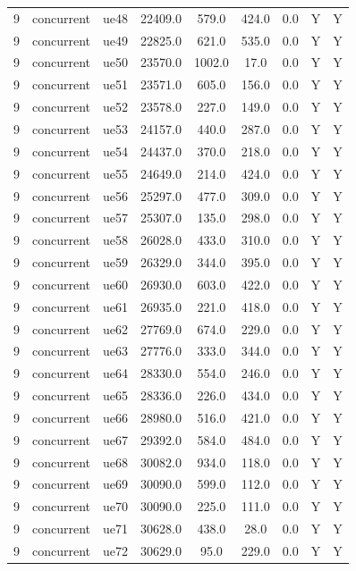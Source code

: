 \begin{table}[ht]
\begin{tabular}{|c|c|c|c|c|c|c|c|c|}
9 & concurrent & ue48 & 22409.0 & 579.0 & 424.0 & 0.0 & Y & Y \\
9 & concurrent & ue49 & 22825.0 & 621.0 & 535.0 & 0.0 & Y & Y \\
9 & concurrent & ue50 & 23570.0 & 1002.0 & 17.0 & 0.0 & Y & Y \\
9 & concurrent & ue51 & 23571.0 & 605.0 & 156.0 & 0.0 & Y & Y \\
9 & concurrent & ue52 & 23578.0 & 227.0 & 149.0 & 0.0 & Y & Y \\
9 & concurrent & ue53 & 24157.0 & 440.0 & 287.0 & 0.0 & Y & Y \\
9 & concurrent & ue54 & 24437.0 & 370.0 & 218.0 & 0.0 & Y & Y \\
9 & concurrent & ue55 & 24649.0 & 214.0 & 424.0 & 0.0 & Y & Y \\
9 & concurrent & ue56 & 25297.0 & 477.0 & 309.0 & 0.0 & Y & Y \\
9 & concurrent & ue57 & 25307.0 & 135.0 & 298.0 & 0.0 & Y & Y \\
9 & concurrent & ue58 & 26028.0 & 433.0 & 310.0 & 0.0 & Y & Y \\
9 & concurrent & ue59 & 26329.0 & 344.0 & 395.0 & 0.0 & Y & Y \\
9 & concurrent & ue60 & 26930.0 & 603.0 & 422.0 & 0.0 & Y & Y \\
9 & concurrent & ue61 & 26935.0 & 221.0 & 418.0 & 0.0 & Y & Y \\
9 & concurrent & ue62 & 27769.0 & 674.0 & 229.0 & 0.0 & Y & Y \\
9 & concurrent & ue63 & 27776.0 & 333.0 & 344.0 & 0.0 & Y & Y \\
9 & concurrent & ue64 & 28330.0 & 554.0 & 246.0 & 0.0 & Y & Y \\
9 & concurrent & ue65 & 28336.0 & 226.0 & 434.0 & 0.0 & Y & Y \\
9 & concurrent & ue66 & 28980.0 & 516.0 & 421.0 & 0.0 & Y & Y \\
9 & concurrent & ue67 & 29392.0 & 584.0 & 484.0 & 0.0 & Y & Y \\
9 & concurrent & ue68 & 30082.0 & 934.0 & 118.0 & 0.0 & Y & Y \\
9 & concurrent & ue69 & 30090.0 & 599.0 & 112.0 & 0.0 & Y & Y \\
9 & concurrent & ue70 & 30090.0 & 225.0 & 111.0 & 0.0 & Y & Y \\
9 & concurrent & ue71 & 30628.0 & 438.0 & 28.0 & 0.0 & Y & Y \\
9 & concurrent & ue72 & 30629.0 & 95.0 & 229.0 & 0.0 & Y & Y \\

\end{tabular}
\end{table}
